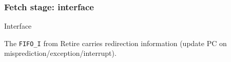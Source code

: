 
\begin{frame}[fragile]
\frametitle{Fetch stage: interface}

\footnotesize

\begin{minipage}{0.725\textwidth}
\end{minipage}
\begin{minipage}{0.25\textwidth}
Interface

\vspace{5ex}

The \verb|FIFO_I| from Retire carries redirection information (update
PC on misprediction/exception/interrupt).

\end{minipage}

\end{frame}


